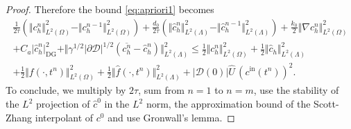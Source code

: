 \documentclass[10pt,a4paper]{amsart}
\newcommand{\DG}{\mathrm{DG}}
\begin{document}
\begin{proof}
Therefore the bound \eqref{eq:apriori1} becomes
\begin{align}
\frac{1}{2\tau}(\Vert c_h^n\Vert_{L^2(\Omega)}^2 - \Vert c_h^{n-1}\Vert_{L^2(\Omega)}^2) 
+\frac{d_0}{2\tau}(\Vert \hat c_h^n\Vert_{L^2(\Lambda)}^2 - \Vert \hat c_h^{n-1}\Vert_{L^2(\Lambda)}^2) 
+  \frac{k_0}{2} \Vert \nabla c_h^n \Vert_{L^2(\Omega)}^2
\nonumber\\
+ C_a \vert \hat c_h^n \vert_{\DG}^2 
+\Vert \gamma^{1/2} \vert \partial\mathcal{D}\vert^{1/2} \left(\overline{c_h^{n}}-\hat{c}_h^{n}\right)\Vert_{L^2(\Lambda)}^2
\leq  
\frac12 \Vert c_h^n\Vert_{L^2(\Omega)}^2
+ \frac12 \Vert \hat c_h \Vert_{L^2(\Lambda)}^2
\nonumber\\
+ \frac12 \Vert f(\cdot,t^n)\Vert_{L^2(\Omega)}^2
+ \frac12 \Vert \hat f(\cdot,t^n) \Vert_{L^2(\Lambda)}^2
+ |\mathcal{D}(0)|\hat U \, (c^{\mathrm{in}}(t^n))^2.
\label{eq:apriori2}
\end{align}
To conclude, we multiply by $2\tau$, sum from $n=1$ to $n=m$,  use the stability of the $L^2$ projection of $\hat c^0$ in the $L^2$ norm, the approximation bound of the Scott-Zhang interpolant of $c^0$ and use Gronwall's lemma. 
\end{proof}
\end{document}
